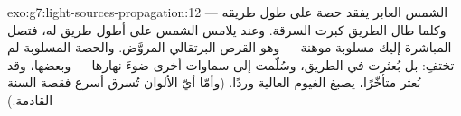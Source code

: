 \begin{solution}{exo:g7:light-sources-propagation:12}
 الشمس العابر  يفقد حصة  على طول طريقه ---
وكلما طال الطريق كبرت السرقة. وعند  يلامس  الشمس
 على أطول طريق له، فتصل  المباشرة إليك
مسلوبة موهنة --- وهو القرص البرتقالي المروَّض. والحصة المسلوبة
لم تختفِ: بل بُعثرت في الطريق، وسُلّمت إلى سماوات أخرى ضوءَ
نهارها --- وبعضها، وقد بُعثر متأخّرًا، يصبغ الغيوم العالية
وردًا. (وأمّا أيّ الألوان تُسرق أسرع فقصة السنة القادمة.)
\end{solution}

